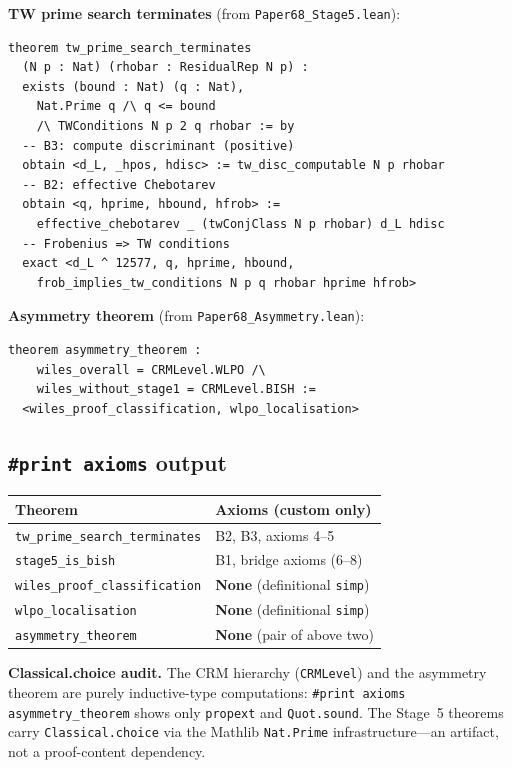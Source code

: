 \documentclass[11pt]{article}
\theoremstyle{plain}
\theoremstyle{definition}
\theoremstyle{remark}
\begin{document}
\textbf{TW prime search terminates} (from
\texttt{Paper68\_Stage5.lean}):

\begin{lstlisting}
theorem tw_prime_search_terminates
  (N p : Nat) (rhobar : ResidualRep N p) :
  exists (bound : Nat) (q : Nat),
    Nat.Prime q /\ q <= bound
    /\ TWConditions N p 2 q rhobar := by
  -- B3: compute discriminant (positive)
  obtain <d_L, _hpos, hdisc> := tw_disc_computable N p rhobar
  -- B2: effective Chebotarev
  obtain <q, hprime, hbound, hfrob> :=
    effective_chebotarev _ (twConjClass N p rhobar) d_L hdisc
  -- Frobenius => TW conditions
  exact <d_L ^ 12577, q, hprime, hbound,
    frob_implies_tw_conditions N p q rhobar hprime hfrob>
\end{lstlisting}

\textbf{Asymmetry theorem} (from
\texttt{Paper68\_Asymmetry.lean}):

\begin{lstlisting}
theorem asymmetry_theorem :
    wiles_overall = CRMLevel.WLPO /\
    wiles_without_stage1 = CRMLevel.BISH :=
  <wiles_proof_classification, wlpo_localisation>
\end{lstlisting}

\subsection{\texttt{\#print axioms} output}

\begin{center}
\small
\begin{tabular}{ll}
\toprule
\textbf{Theorem} & \textbf{Axioms (custom only)} \\
\midrule
\texttt{tw\_prime\_search\_terminates} &
  B2, B3, axioms 4--5 \\
\texttt{stage5\_is\_bish} &
  B1, bridge axioms (6--8) \\
\texttt{wiles\_proof\_classification} &
  \textbf{None} (definitional \texttt{simp}) \\
\texttt{wlpo\_localisation} &
  \textbf{None} (definitional \texttt{simp}) \\
\texttt{asymmetry\_theorem} &
  \textbf{None} (pair of above two) \\
\bottomrule
\end{tabular}
\end{center}

\medskip\noindent
\begin{sloppypar}
\textbf{Classical.choice audit.}  The CRM hierarchy
(\texttt{CRMLevel}) and the asymmetry theorem are purely
inductive-type computations:
\texttt{\#print axioms asymmetry\_theorem}
shows only \texttt{propext} and \texttt{Quot.sound}.
The Stage~5 theorems carry
\texttt{Classical.choice} via the Mathlib
\texttt{Nat.Prime} infrastructure---an artifact, not
a proof-content dependency.
\end{sloppypar}
\end{document}
